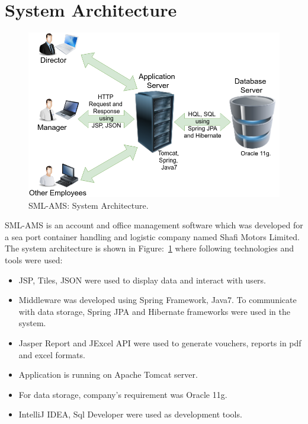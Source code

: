 \documentclass[12pt]{article}
\begin{document}
\section{System Architecture}
\begin{figure}
	
    \centering
	\includegraphics[width=\linewidth]{SML-AMS-System-Architecture.png}
    \caption{SML-AMS: System Architecture.}
    \label{fig:system-architecture}

\end{figure}

SML-AMS is an account and office management software which was developed for a sea port container handling and logistic company named Shafi Motors Limited\cite{SML:1965}. The system architecture is shown in Figure:~\ref{fig:system-architecture} where following technologies and tools were used:

\begin{itemize}

	\item JSP, Tiles, JSON were used to display data and interact with users.

	\item Middleware was developed using Spring Framework, Java7. To communicate with data storage, Spring JPA and Hibernate frameworks were used in the system.
    
    \item Jasper Report and JExcel API were used to generate vouchers, reports in pdf and excel formats.
    
    \item Application is running on Apache Tomcat server.
    
    \item For data storage, company's requirement was Oracle 11g.
    
    \item IntelliJ IDEA, Sql Developer were used as development tools.

\end{itemize}
\end{document}
